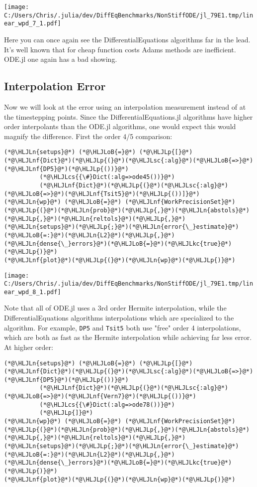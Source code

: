 \documentclass[12pt,a4paper]{article}
\newcommand{\HLJLkc}[1]{\textcolor[RGB]{59,151,46}{\textit{#1}}}
\newcommand{\HLJLn}[1]{#1}
\newcommand{\HLJLnf}[1]{\textcolor[RGB]{66,102,213}{#1}}
\newcommand{\HLJLsc}[1]{\textcolor[RGB]{201,61,57}{#1}}
\newcommand{\HLJLoB}[1]{\textcolor[RGB]{102,102,102}{\textbf{#1}}}
\newcommand{\HLJLp}[1]{#1}
\newcommand{\HLJLcs}[1]{\textcolor[RGB]{153,153,119}{\textit{#1}}}
\begin{document}
\texttt{[image: C:/Users/Chris/.julia/dev/DiffEqBenchmarks/NonStiffODE/jl\_79E1.tmp/linear\_wpd\_7\_1.pdf]}

Here you can once again see the DifferentialEquations algorithms far in the lead. It's well known that for cheap function costs Adams methods are inefficient. ODE.jl one again has a bad showing.

\subsection{Interpolation Error}
Now we will look at the error using an interpolation measurement instead of at the timestepping points. Since the DifferentialEquations.jl algorithms have higher order interpolants than the ODE.jl algorithms, one would expect this would magnify the difference. First the order 4/5 comparison:


\begin{lstlisting}
(*@\HLJLn{setups}@*) (*@\HLJLoB{=}@*) (*@\HLJLp{[}@*)(*@\HLJLnf{Dict}@*)(*@\HLJLp{(}@*)(*@\HLJLsc{:alg}@*)(*@\HLJLoB{=>}@*)(*@\HLJLnf{DP5}@*)(*@\HLJLp{())}@*)
          (*@\HLJLcs{{\#}Dict(:alg=>ode45())}@*)
          (*@\HLJLnf{Dict}@*)(*@\HLJLp{(}@*)(*@\HLJLsc{:alg}@*)(*@\HLJLoB{=>}@*)(*@\HLJLnf{Tsit5}@*)(*@\HLJLp{())]}@*)
(*@\HLJLn{wp}@*) (*@\HLJLoB{=}@*) (*@\HLJLnf{WorkPrecisionSet}@*)(*@\HLJLp{(}@*)(*@\HLJLn{prob}@*)(*@\HLJLp{,}@*)(*@\HLJLn{abstols}@*)(*@\HLJLp{,}@*)(*@\HLJLn{reltols}@*)(*@\HLJLp{,}@*)(*@\HLJLn{setups}@*)(*@\HLJLp{;}@*)(*@\HLJLn{error{\_}estimate}@*)(*@\HLJLoB{=:}@*)(*@\HLJLn{L2}@*)(*@\HLJLp{,}@*)(*@\HLJLn{dense{\_}errors}@*)(*@\HLJLoB{=}@*)(*@\HLJLkc{true}@*)(*@\HLJLp{)}@*)
(*@\HLJLnf{plot}@*)(*@\HLJLp{(}@*)(*@\HLJLn{wp}@*)(*@\HLJLp{)}@*)
\end{lstlisting}

\texttt{[image: C:/Users/Chris/.julia/dev/DiffEqBenchmarks/NonStiffODE/jl\_79E1.tmp/linear\_wpd\_8\_1.pdf]}

Note that all of ODE.jl uses a 3rd order Hermite interpolation, while the DifferentialEquations algorithms interpolations which are specialized to the algorithm. For example, \texttt{DP5} and \texttt{Tsit5} both use "free" order 4 interpolations, which are both as fast as the Hermite interpolation while achieving far less error. At higher order:


\begin{lstlisting}
(*@\HLJLn{setups}@*) (*@\HLJLoB{=}@*) (*@\HLJLp{[}@*)(*@\HLJLnf{Dict}@*)(*@\HLJLp{(}@*)(*@\HLJLsc{:alg}@*)(*@\HLJLoB{=>}@*)(*@\HLJLnf{DP5}@*)(*@\HLJLp{())}@*)
          (*@\HLJLnf{Dict}@*)(*@\HLJLp{(}@*)(*@\HLJLsc{:alg}@*)(*@\HLJLoB{=>}@*)(*@\HLJLnf{Vern7}@*)(*@\HLJLp{())}@*)
          (*@\HLJLcs{{\#}Dict(:alg=>ode78())}@*)
          (*@\HLJLp{]}@*)
(*@\HLJLn{wp}@*) (*@\HLJLoB{=}@*) (*@\HLJLnf{WorkPrecisionSet}@*)(*@\HLJLp{(}@*)(*@\HLJLn{prob}@*)(*@\HLJLp{,}@*)(*@\HLJLn{abstols}@*)(*@\HLJLp{,}@*)(*@\HLJLn{reltols}@*)(*@\HLJLp{,}@*)(*@\HLJLn{setups}@*)(*@\HLJLp{;}@*)(*@\HLJLn{error{\_}estimate}@*)(*@\HLJLoB{=:}@*)(*@\HLJLn{L2}@*)(*@\HLJLp{,}@*)(*@\HLJLn{dense{\_}errors}@*)(*@\HLJLoB{=}@*)(*@\HLJLkc{true}@*)(*@\HLJLp{)}@*)
(*@\HLJLnf{plot}@*)(*@\HLJLp{(}@*)(*@\HLJLn{wp}@*)(*@\HLJLp{)}@*)
\end{lstlisting}
\end{document}
